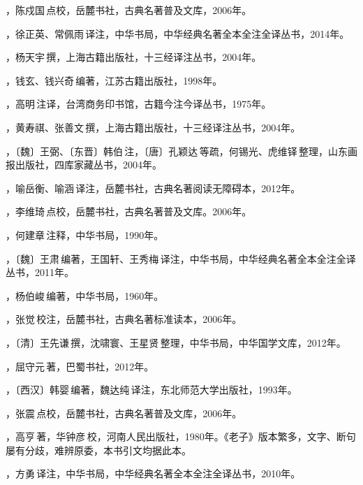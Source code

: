 ，陈戍国\,点校，岳麓书社，古典名著普及文库，2006年。

，徐正英、常佩雨\,译注，中华书局，中华经典名著全本全注全译丛书，2014年。

，杨天宇\,撰，上海古籍出版社，十三经译注丛书，2004年。

，钱玄、钱兴奇\,编著，江苏古籍出版社，1998年。

，高明\,注译，台湾商务印书馆，古籍今注今译丛书，1975年。

，黄寿祺、张善文\,撰，上海古籍出版社，十三经译注丛书，2004年。

，〔魏〕王弼、〔东晋〕韩伯\,注，〔唐〕孔颖达\,等疏，何锡光、虎维铎\,整理，山东画报出版社，四库家藏丛书，2004年。

，喻岳衡、喻涵\,译注，岳麓书社，古典名著阅读无障碍本，2012年。

，李维琦\,点校，岳麓书社，古典名著普及文库。2006年。

，何建章\,注释，中华书局，1990年。

，〔魏〕王肃\,编著，王国轩、王秀梅\,译注，中华书局，中华经典名著全本全注全译丛书，2011年。

，杨伯峻\,编著，中华书局，1960年。

，张觉\,校注，岳麓书社，古典名著标准读本，2006年。

，〔清〕王先谦\,撰，沈啸寰、王星贤\,整理，中华书局，中华国学文库，2012年。

，屈守元\,著，巴蜀书社，2012年。

，〔西汉〕韩婴\,编著，魏达纯\,译注，东北师范大学出版社，1993年。

，张震\,点校，岳麓书社，古典名著普及文库，2006年。

，高亨\,著，华钟彦\,校，河南人民出版社，1980年。《老子》版本繁多，文字、断句屡有分歧，难辨原委，本书引文均据此本。

，方勇\,译注，中华书局，中华经典名著全本全注全译丛书，2010年。

